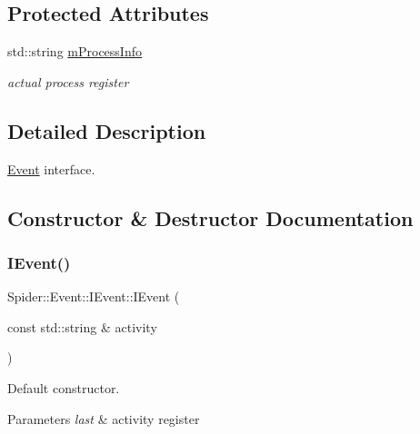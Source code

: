 \subsection*{Protected Attributes}
\begin{DoxyCompactItemize}
\item 
\mbox{\label{class_spider_1_1_event_1_1_i_event_a07aaa4ec795b2b70c10e34e832ec7b71}} 
std\+::string \hyperlink{class_spider_1_1_event_1_1_i_event_a07aaa4ec795b2b70c10e34e832ec7b71}{m\+Process\+Info}
\begin{DoxyCompactList}\small\item\em actual process register \end{DoxyCompactList}\end{DoxyCompactItemize}


\subsection{Detailed Description}
\hyperlink{namespace_spider_1_1_event}{Event} interface. 

\subsection{Constructor \& Destructor Documentation}
\mbox{\label{class_spider_1_1_event_1_1_i_event_aaebd414668b8f358b5cc1bc655038256}} 
\subsubsection{\texorpdfstring{I\+Event()}{IEvent()}}
{\footnotesize\ttfamily Spider\+::\+Event\+::\+I\+Event\+::\+I\+Event (\begin{DoxyParamCaption}\item[{const std\+::string \&}]{activity }\end{DoxyParamCaption})\hspace{0.3cm}{\ttfamily [inline]}}



Default constructor. 


\begin{DoxyParams}{Parameters}
{\em last} & activity register \\
\hline
\end{DoxyParams}


